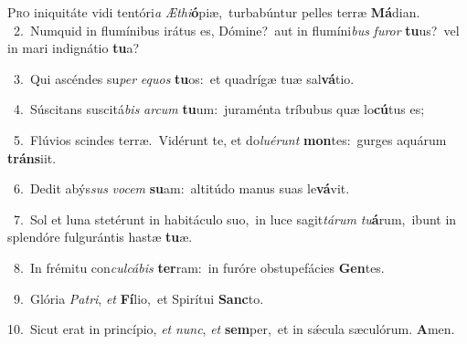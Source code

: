 \lettrine{\initial\textcolor{\initialcolor}{P}}{ro} iniquitáte vidi tentóri\textit{a} \textit{Æ}\-\textit{thi}\textbf{ó}piæ,~\star turbabúntur pelles terræ \textbf{Má}\-dian.\\
{\numbfont\textcolor{\numbcolor}{~2.}}~Numquid in flumínibus irátus es, Dómine?~\dagger aut in flumíni\textit{bus} \textit{fu}\-\textit{ror} \textbf{tu}\-us?~\star vel in mari indignátio \textbf{tu}\-a?\par
{\numbfont\textcolor{\numbcolor}{~3.}}~Qui ascéndes su\textit{per} \textit{e}\-\textit{quos} \textbf{tu}\-os:~\star et quadrígæ tuæ sal\-\textbf{vá}\-tio.\par
{\numbfont\textcolor{\numbcolor}{~4.}}~Súscitans suscitá\textit{bis} \textit{ar}\-\textit{cum} \textbf{tu}\-um:~\star juraménta tríbubus quæ lo\-\textbf{cú}\-tus es;\par
{\numbfont\textcolor{\numbcolor}{~5.}}~Flúvios scindes terræ.~\dagger Vidérunt te, et do\-\textit{lu}\-\textit{é}\textit{runt} \textbf{mon}\-tes:~\star gurges aquárum \textbf{tráns}\-iit.\par
{\numbfont\textcolor{\numbcolor}{~6.}}~Dedit abýs\textit{sus} \textit{vo}\-\textit{cem} \textbf{su}\-am:~\star altitúdo manus suas le\-\textbf{vá}\-vit.\par
{\numbfont\textcolor{\numbcolor}{~7.}}~Sol et luna stetérunt in habitáculo suo,~\dagger in luce sagit\-\textit{tá}\-\textit{rum} \textit{tu}\-\textbf{á}rum,~\star ibunt in splendóre fulgurántis hastæ \textbf{tu}\-æ.\par
{\numbfont\textcolor{\numbcolor}{~8.}}~In frémitu con\-\textit{cul}\-\textit{cá}\textit{bis} \textbf{ter}\-ram:~\star in furóre obstupefácies \textbf{Gen}\-tes.\par
{\numbfont\textcolor{\numbcolor}{~9.}}~Glória \textit{Pa}\-\textit{tri}, \textit{et} \textbf{Fí}\-lio,~\star et Spirítui \textbf{Sanc}\-to.\par
{\numbfont\textcolor{\numbcolor}{10.}}~Sicut erat in princípio, \textit{et} \textit{nunc}\-, \textit{et} \textbf{sem}\-per,~\star et in sǽcula sæculórum. \textbf{A}\-men.\par

